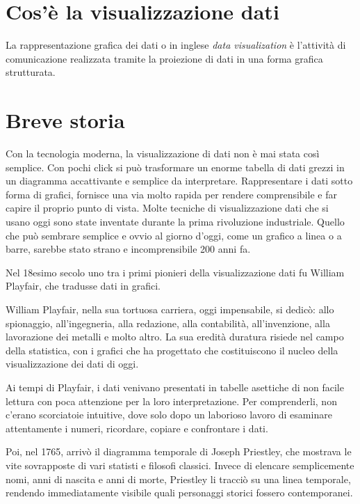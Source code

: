 
\section{Cos'è la visualizzazione dati }
La rappresentazione grafica dei dati o in inglese \emph{data visualization} è l’attività di comunicazione realizzata tramite la proiezione di dati in una forma grafica strutturata.

\section{Breve storia}

Con la tecnologia moderna, la visualizzazione di dati non è mai stata così semplice.
Con pochi click si può trasformare un enorme tabella di dati grezzi in un diagramma accattivante e semplice da interpretare.
Rappresentare i dati sotto forma di grafici, fornisce una via molto rapida per rendere comprensibile e far capire il proprio punto di vista.
Molte tecniche di visualizzazione dati che si usano oggi sono state  inventate durante la prima rivoluzione industriale.
Quello che può sembrare semplice e ovvio al giorno d’oggi, come un grafico a linea o a barre, sarebbe stato strano e incomprensibile 200 anni fa.


\noindent Nel 18esimo secolo uno tra i primi pionieri della visualizzazione dati  fu William Playfair, che tradusse dati in grafici. 

\noindent William Playfair, nella sua tortuosa carriera, oggi impensabile, si dedicò: allo spionaggio, all’ingegneria, alla redazione, alla contabilità, all’invenzione, alla lavorazione dei metalli e molto altro. La sua eredità duratura risiede nel campo della statistica, con i grafici che ha progettato che costituiscono il nucleo della visualizzazione dei dati di oggi.

\noindent Ai tempi di Playfair, i dati venivano presentati in tabelle asettiche di non facile lettura con poca attenzione per la loro interpretazione. Per comprenderli, non c’erano scorciatoie intuitive, dove solo dopo un laborioso lavoro di esaminare attentamente i numeri, ricordare, copiare e confrontare i dati.

\noindent Poi, nel 1765, arrivò il diagramma temporale di Joseph Priestley, che mostrava le vite sovrapposte di vari statisti e filosofi classici. Invece di elencare semplicemente nomi, anni di nascita e anni di morte, Priestley li tracciò su una linea temporale, rendendo immediatamente visibile quali personaggi storici fossero contemporanei.

